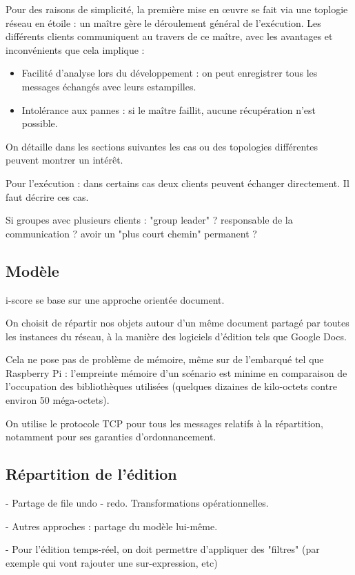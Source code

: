 \documentclass{article}
\begin{document}
Pour des raisons de simplicité, la première mise en œuvre se fait via une toplogie réseau en étoile : un maître gère 
le déroulement général de l'exécution. 
Les différents clients communiquent au travers de ce maître, avec les avantages et inconvénients que cela implique : 
\begin{itemize}
	\item Facilité d'analyse lors du développement : on peut enregistrer tous les messages échangés avec leurs estampilles.
	\item Intolérance aux pannes : si le maître faillit, aucune récupération n'est possible.
\end{itemize}

On détaille dans les sections suivantes les cas ou des topologies différentes peuvent montrer un intérêt.

Pour l'exécution : dans certains cas deux clients peuvent échanger directement.
Il faut décrire ces cas.

Si groupes avec plusieurs clients : "group leader" ? responsable de la communication ? avoir un "plus court chemin" permanent ?

\subsection{Modèle}
i-score se base sur une approche orientée document.

On choisit de répartir nos objets autour d'un même document partagé par toutes les instances du réseau, 
à la manière des logiciels d'édition tels que Google Docs. %

Cela ne pose pas de problème de mémoire, même sur de l'embarqué tel que Raspberry Pi : l'empreinte mémoire d'un scénario est minime en comparaison de l'occupation des bibliothèques utilisées (quelques dizaines de kilo-octets contre environ 50 méga-octets).

On utilise le protocole TCP pour tous les messages relatifs à la répartition, notamment pour ses garanties d'ordonnancement.
\subsection{Répartition de l'édition}
- Partage de file undo - redo. Transformations opérationnelles. %

- Autres approches : partage du modèle lui-même.

- Pour l'édition temps-réel, on doit permettre d'appliquer des "filtres" (par exemple qui vont rajouter une sur-expression, etc)
\end{document}
